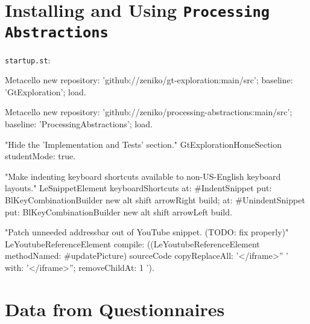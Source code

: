 
\chapter{Installing and Using \texttt{Processing Abstractions}} \label{ch_setup}

\texttt{startup.st}:

\begin{code}
Metacello new
	repository: 'github://zeniko/gt-exploration:main/src';
	baseline: 'GtExploration';
	load.

Metacello new
	repository: 'github://zeniko/processing-abstractions:main/src';
	baseline: 'ProcessingAbstractions';
	load.

"Hide the 'Implementation and Tests' section."
GtExplorationHomeSection studentMode: true.

"Make indenting keyboard shortcuts available to non-US-English keyboard layouts."
LeSnippetElement keyboardShortcuts
	at: #IndentSnippet
		put: BlKeyCombinationBuilder new alt shift arrowRight build;
	at: #UnindentSnippet
		put: BlKeyCombinationBuilder new alt shift arrowLeft build.

"Patch unneeded addressbar out of YouTube snippet. (TODO: fix properly)"
LeYoutubeReferenceElement compile:
	((LeYoutubeReferenceElement methodNamed: #updatePicture) sourceCode
		copyReplaceAll: '</iframe>'' ' with: '</iframe>''; removeChildAt: 1 ').
\end{code}


\chapter{Data from Questionnaires}
